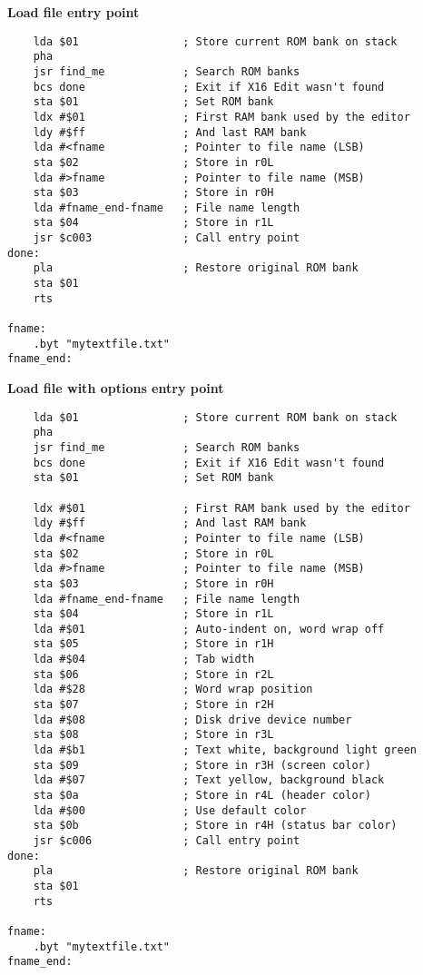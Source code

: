 \documentclass{article}
\begin{document}
    \textbf{Load file entry point}
\begin{verbatim}
    lda $01                ; Store current ROM bank on stack
    pha
    jsr find_me            ; Search ROM banks
    bcs done               ; Exit if X16 Edit wasn't found
    sta $01                ; Set ROM bank  
    ldx #$01               ; First RAM bank used by the editor
    ldy #$ff               ; And last RAM bank
    lda #<fname            ; Pointer to file name (LSB)
    sta $02                ; Store in r0L
    lda #>fname            ; Pointer to file name (MSB)
    sta $03                ; Store in r0H
    lda #fname_end-fname   ; File name length
    sta $04                ; Store in r1L
    jsr $c003              ; Call entry point
done:
    pla                    ; Restore original ROM bank
    sta $01
    rts

fname:
    .byt "mytextfile.txt"
fname_end:
\end{verbatim}

    \textbf{Load file with options entry point}
\begin{verbatim}
    lda $01                ; Store current ROM bank on stack
    pha
    jsr find_me            ; Search ROM banks
    bcs done               ; Exit if X16 Edit wasn't found
    sta $01                ; Set ROM bank
    
    ldx #$01               ; First RAM bank used by the editor
    ldy #$ff               ; And last RAM bank
    lda #<fname            ; Pointer to file name (LSB)
    sta $02                ; Store in r0L
    lda #>fname            ; Pointer to file name (MSB)
    sta $03                ; Store in r0H
    lda #fname_end-fname   ; File name length
    sta $04                ; Store in r1L
    lda #$01               ; Auto-indent on, word wrap off
    sta $05                ; Store in r1H
    lda #$04               ; Tab width
    sta $06                ; Store in r2L
    lda #$28               ; Word wrap position
    sta $07                ; Store in r2H
    lda #$08               ; Disk drive device number
    sta $08                ; Store in r3L
    lda #$b1               ; Text white, background light green
    sta $09                ; Store in r3H (screen color)
    lda #$07               ; Text yellow, background black
    sta $0a                ; Store in r4L (header color)
    lda #$00               ; Use default color
    sta $0b                ; Store in r4H (status bar color)
    jsr $c006              ; Call entry point
done:
    pla                    ; Restore original ROM bank
    sta $01
    rts
   
fname:
    .byt "mytextfile.txt"
fname_end:
\end{verbatim}
\end{document}
